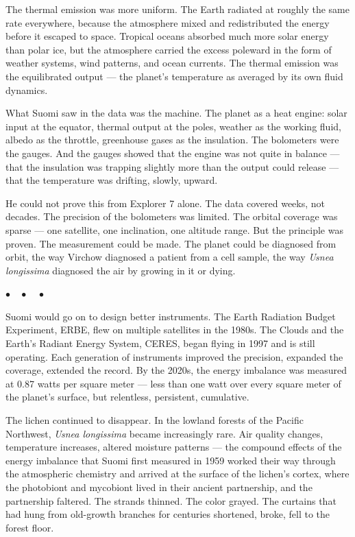 \documentclass[12pt, letterpaper]{article}
\begin{document}
The thermal emission was more uniform. The Earth radiated at roughly the same rate everywhere, because the atmosphere mixed and redistributed the energy before it escaped to space. Tropical oceans absorbed much more solar energy than polar ice, but the atmosphere carried the excess poleward in the form of weather systems, wind patterns, and ocean currents. The thermal emission was the equilibrated output --- the planet's temperature as averaged by its own fluid dynamics.

What Suomi saw in the data was the machine. The planet as a heat engine: solar input at the equator, thermal output at the poles, weather as the working fluid, albedo as the throttle, greenhouse gases as the insulation. The bolometers were the gauges. And the gauges showed that the engine was not quite in balance --- that the insulation was trapping slightly more than the output could release --- that the temperature was drifting, slowly, upward.

He could not prove this from Explorer 7 alone. The data covered weeks, not decades. The precision of the bolometers was limited. The orbital coverage was sparse --- one satellite, one inclination, one altitude range. But the principle was proven. The measurement could be made. The planet could be diagnosed from orbit, the way Virchow diagnosed a patient from a cell sample, the way \textit{Usnea longissima} diagnosed the air by growing in it or dying.

\begin{center}
$\bullet\quad\bullet\quad\bullet$
\end{center}

Suomi would go on to design better instruments. The Earth Radiation Budget Experiment, ERBE, flew on multiple satellites in the 1980s. The Clouds and the Earth's Radiant Energy System, CERES, began flying in 1997 and is still operating. Each generation of instruments improved the precision, expanded the coverage, extended the record. By the 2020s, the energy imbalance was measured at 0.87 watts per square meter --- less than one watt over every square meter of the planet's surface, but relentless, persistent, cumulative.

The lichen continued to disappear. In the lowland forests of the Pacific Northwest, \textit{Usnea longissima} became increasingly rare. Air quality changes, temperature increases, altered moisture patterns --- the compound effects of the energy imbalance that Suomi first measured in 1959 worked their way through the atmospheric chemistry and arrived at the surface of the lichen's cortex, where the photobiont and mycobiont lived in their ancient partnership, and the partnership faltered. The strands thinned. The color grayed. The curtains that had hung from old-growth branches for centuries shortened, broke, fell to the forest floor.
\end{document}
